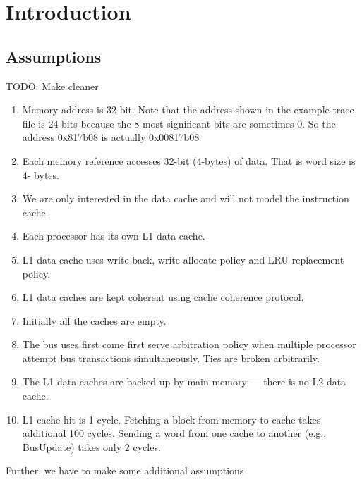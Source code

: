 \section{Introduction}


\subsection{Assumptions}


TODO: Make cleaner
\begin{enumerate}
    \item Memory address is 32-bit. Note that the address shown in the example trace file is 24 bits
          because the 8 most significant bits are sometimes 0. So the address 0x817b08 is actually 0x00817b08
    \item Each memory reference accesses 32-bit (4-bytes) of data. That is word size is 4- bytes.
    \item We are only interested in the data cache and will not model the instruction cache.
    \item Each processor has its own L1 data cache.
    \item L1 data cache uses write-back, write-allocate policy and LRU replacement policy.
    \item L1 data caches are kept coherent using cache coherence protocol.
    \item Initially all the caches are empty.
    \item The bus uses first come first serve arbitration policy when multiple processor attempt bus
          transactions simultaneously. Ties are broken arbitrarily.
    \item The L1 data caches are backed up by main memory --- there is no L2 data cache.
    \item L1 cache hit is 1 cycle. Fetching a block from memory to cache takes additional 100 cycles.
          Sending a word from one cache to another (e.g., BusUpdate) takes only 2 cycles.
\end{enumerate}

Further, we have to make some additional assumptions

